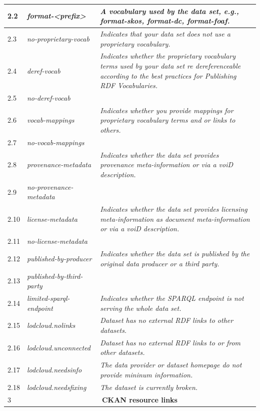 \begin{longtable}[c]{|l|p{5cm}|p{10cm}|}
  2.2&\textit{format-<prefix>}& \textit{A vocabulary used by the data set, e.g., format-skos, format-dc, format-foaf.} \\ \hline
  2.3&\textit{no-proprietary-vocab}& \textit{Indicates that your data set does not use a proprietary vocabulary.} \\ \hline
  2.4 &\textit{deref-vocab}& \textit{Indicates whether the proprietary vocabulary terms used by your data set re dereferenceable according to the best practices for Publishing RDF Vocabularies.}\\ \hline
  2.5&\textit{no-deref-vocab}& \\ \hline
  2.6&\textit{vocab-mappings}& \textit{Indicates whether you provide mappings for proprietary vocabulary terms and or links to others.} \\ \hline
  2.7&\textit{no-vocab-mappings}& \\ \hline
  2.8&\textit{provenance-metadata}& \textit{Indicates whether the data set provides provenance meta-information or via a voiD description.}\\ \hline
  2.9&\textit{no-provenance-metadata}& \\ \hline
  2.10&\textit{license-metadata}& \textit{Indicates whether the data set provides licensing meta-information as document meta-information or via a voiD description.}\\ \hline
  2.11&\textit{no-license-metadata}& \\ \hline	
  2.12&\textit{published-by-producer}& \textit{Indicates whether the data set is published by the original data producer or a third party.}\\ \hline
  2.13&\textit{published-by-third-party}& \\ \hline		
  2.14&\textit{limited-sparql-endpoint}& \textit{Indicates whether the \gls{SPARQL} endpoint is not serving the whole data set.}\\ \hline
  2.15&\textit{lodcloud.nolinks}& \textit{Dataset has no external RDF links to other datasets.}\\ \hline		
  2.16&\textit{lodcloud.unconnected} &\textit{Dataset has no external RDF links to or from other datasets.} \\ \hline
  2.17&\textit{lodcloud.needsinfo}& \textit{The data provider or dataset homepage do not provide mininum information.} \\ \hline				
  2.18&\textit{lodcloud.needsfixing}& \textit{The dataset is currently broken.} \\ \hline				
  3& \multicolumn{2}{|c|}{\textbf{CKAN resource links}}  \\ \hline

\end{longtable}
